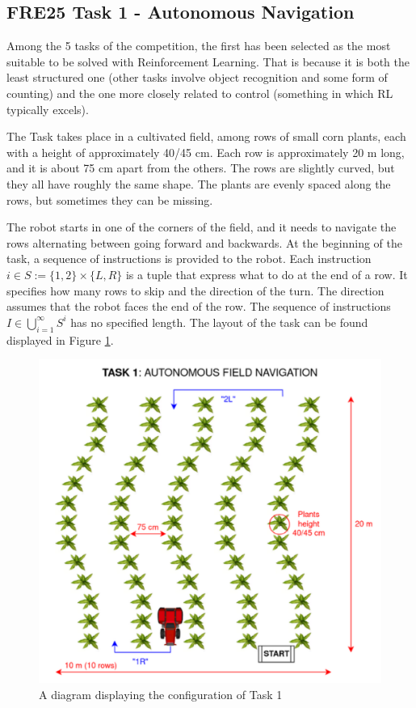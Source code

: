 \documentclass[11pt,a4paper,twocolumn]{article}
\begin{document}
\subsection{FRE25 Task 1 - Autonomous Navigation}
Among the 5 tasks of the competition, the first has been selected as the most suitable to be solved with Reinforcement Learning. That is because it is both the least structured one (other tasks involve object recognition and some form of counting) and the one more closely related to control (something in which RL typically excels).

The Task takes place in a cultivated field, among rows of small corn plants, each with a height of approximately 40/45 cm. Each row is approximately 20 m long, and it is about 75 cm apart from the others. The rows are slightly curved, but they all have roughly the same shape. The plants are evenly spaced along the rows, but sometimes they can be missing.

The robot starts in one of the corners of the field, and it needs to navigate the rows alternating between going forward and backwards. At the beginning of the task, a sequence of instructions is provided to the robot. Each instruction $i \in S := \{1,2\} \times \{L, R\}$ is a tuple that express what to do at the end of a row. It specifies how many rows to skip and the direction of the turn. The direction assumes that the robot faces the end of the row. The sequence of instructions $I \in \bigcup_{i=1}^{\infty}S^i$ has no specified length. The layout of the task can be found displayed in Figure \ref{fig:task1}.

\begin{figure}
    \centering
    \includegraphics[width=\linewidth]{Multidisciplinary_Project_Report//Images/Task1Schema.png}
    \caption{A diagram displaying the configuration of Task 1}
    \label{fig:task1}
\end{figure}
\end{document}
